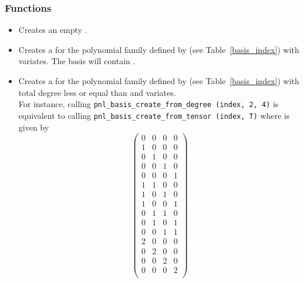 \subsubsection{Functions}

\begin{itemize}
\item {}
  \sshortdescribe Creates an empty .

\item {}
  \sshortdescribe Creates a  for the polynomial family
  defined by  (see Table~\ref{basis_index}) with 
  variates. The basis will contain .

\item {}
  \sshortdescribe Creates a  for the polynomial family
  defined by  (see Table~\ref{basis_index}) with total degree less
  or equal than  and  variates.\\
  For instance, calling \verb!pnl_basis_create_from_degree (index, 2, 4)! is
  equivalent to calling \verb!pnl_basis_create_from_tensor (index, T)! where
   is given by
  \[ \left(
    \begin{array}{cccc}
      0 & 0 & 0 & 0\\
      1 & 0 & 0 & 0\\
      0 & 1 & 0 & 0\\
      0 & 0 & 1 & 0\\
      0 & 0 & 0 & 1\\
      1 & 1 & 0 & 0\\
      1 & 0 & 1 & 0\\
      1 & 0 & 0 & 1\\
      0 & 1 & 1 & 0\\
      0 & 1 & 0 & 1\\
      0 & 0 & 1 & 1\\
      2 & 0 & 0 & 0\\
      0 & 2 & 0 & 0\\
      0 & 0 & 2 & 0\\
      0 & 0 & 0 & 2\\
    \end{array}
  \right) \]



\end{itemize}
